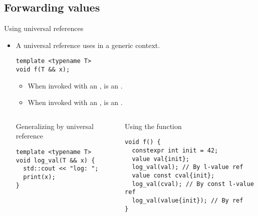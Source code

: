 \subsection{Forwarding values}

\begin{frame}[t,fragile]{Using universal references}
\begin{itemize}
  \item A universal reference uses \cppkey{\&\&} in a generic context.
\begin{lstlisting}
template <typename T>
void f(T && x);
\end{lstlisting}
    
     \pause
     \begin{itemize}
       \item When invoked with an ,  is an .
       \item When invoked with an ,  is an .
     \end{itemize}

\pause
\begin{columns}[T]

\begin{block}{Generalizing by universal reference}
\begin{lstlisting}
template <typename T>
void log_val(T && x) {
  std::cout << "log: ";
  print(x);
}
\end{lstlisting}
\end{block}

\begin{block}{Using the function}
\begin{lstlisting}
void f() {
  constexpr int init = 42;
  value val{init};
  log_val(val); // By l-value ref
  value const cval{init};
  log_val(cval); // By const l-value ref
  log_val(value{init}); // By ref
}
\end{lstlisting}
\end{block}

\end{columns}

\end{itemize}
\end{frame}

